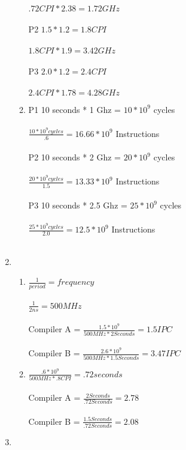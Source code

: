 \documentclass[a4paper]{article}
\begin{document}
\begin{enumerate}
\begin{enumerate}
\\
\\
$.72CPI * 2.38 = 1.72GHz$
\\
\\
P2 $1.5 * 1.2 = 1.8 CPI$
\\
\\
$1.8CPI * 1.9 = 3.42GHz$
\\
\\
P3 $2.0 * 1.2 = 2.4 CPI$
\\
\\
$2.4CPI * 1.78 = 4.28GHz$
\\
\item 
P1 10 seconds * 1 Ghz = $10*10^9$ cycles
\\
\\
$\frac{10*10^9 cycles}{.6} = 16.66*10^9$ Instructions
\\
\\
P2 10 seconds * 2 Ghz = $20*10^9$ cycles
\\
\\
$\frac{20*10^9 cycles}{1.5} = 13.33*10^9$ Instructions
\\
\\
P3 10 seconds * 2.5 Ghz = $25*10^9$ cycles
\\
\\
$\frac{25*10^9 cycles}{2.0} = 12.5*10^9$ Instructions
\\
\\
\end{enumerate}
\item
\begin{enumerate}
\item $\frac {1}{period}=frequency$
\\
\\
$\frac {1}{2ns}=500MHz$
\\ 
\\
Compiler A = $\frac {1.5 * 10^9}{500MHz * 2 Seconds} = 1.5 IPC$
\\
\\
Compiler B = $\frac {2.6 * 10^9}{500MHz * 1.5 Seconds} = 3.47 IPC$
\item $\frac {.6 * 10^9}{500MHz * .8 CPI} = .72 seconds$
\\
\\
Compiler A = $\frac {2 Seconds}{.72 Seconds} = 2.78$
\\
\\
Compiler B = $\frac {1.5 Seconds}{.72 Seconds} = 2.08$
\\
\end{enumerate}
\item

\end{enumerate}
\end{document}
